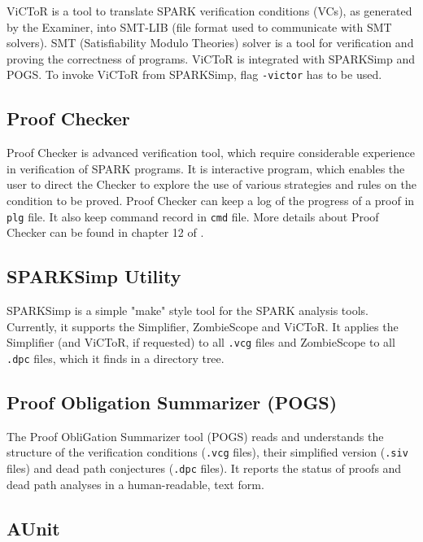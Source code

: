 ViCToR is a tool to translate SPARK verification conditions (VCs), as generated by the Examiner, into SMT-LIB (file format used to communicate with SMT solvers). \cite{Victor:Online} SMT (Satisfiability Modulo Theories) solver is a tool for verification and proving the correctness of programs. ViCToR is integrated with SPARKSimp and POGS. To invoke ViCToR from SPARKSimp, flag \lstinline{-victor} has to be used.


\subsection{Proof Checker}
\label{verification:proofchecker}

Proof Checker is advanced verification tool, which require considerable experience in verification of SPARK programs. It is interactive program, which enables the user to direct the Checker to explore the use of various strategies and rules on the condition to be proved. Proof Checker can keep a log of the progress of a proof in \lstinline{plg} file. It also keep command record in \lstinline{cmd} file. More details about Proof Checker can be found in chapter 12 of \cite{Barnes:Book}.


\subsection{SPARKSimp Utility}
\label{verification:sparksimp}
SPARKSimp is a simple "make" style tool for the SPARK analysis tools. Currently, it supports the Simplifier, ZombieScope and ViCToR. It applies the Simplifier (and ViCToR, if requested) to all \lstinline{.vcg} files and ZombieScope to all \lstinline{.dpc} files, which it finds in a directory tree. \cite{SPARKSimp:Online} 


\subsection{Proof Obligation Summarizer (POGS)}
\label{verification:pogs}

The Proof ObliGation Summarizer tool (POGS) reads and understands the structure of the verification conditions (\lstinline{.vcg} files), their simplified version (\lstinline{.siv} files) and dead path conjectures (\lstinline{.dpc} files). It reports the status of proofs and dead path analyses in a human-readable, text form. \cite{POGS:Online} 


\subsection{AUnit}
\label{background:spark:aunit}

